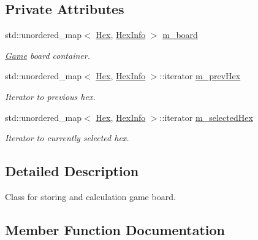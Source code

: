 \subsection*{Private Attributes}
\begin{DoxyCompactItemize}
\item 
std\+::unordered\+\_\+map$<$ \hyperlink{classHex}{Hex}, \hyperlink{structHexInfo}{Hex\+Info} $>$ \hyperlink{classBoard_a3f1155ac66a6cb3fe4d769860f0aba3b}{m\+\_\+board}\hypertarget{classBoard_a3f1155ac66a6cb3fe4d769860f0aba3b}{}\label{classBoard_a3f1155ac66a6cb3fe4d769860f0aba3b}

\begin{DoxyCompactList}\small\item\em \hyperlink{classGame}{Game} board container. \end{DoxyCompactList}\item 
std\+::unordered\+\_\+map$<$ \hyperlink{classHex}{Hex}, \hyperlink{structHexInfo}{Hex\+Info} $>$\+::iterator \hyperlink{classBoard_a4199477dd54758f6b278d566792645c5}{m\+\_\+prev\+Hex}\hypertarget{classBoard_a4199477dd54758f6b278d566792645c5}{}\label{classBoard_a4199477dd54758f6b278d566792645c5}

\begin{DoxyCompactList}\small\item\em Iterator to previous hex. \end{DoxyCompactList}\item 
std\+::unordered\+\_\+map$<$ \hyperlink{classHex}{Hex}, \hyperlink{structHexInfo}{Hex\+Info} $>$\+::iterator \hyperlink{classBoard_a0d1187868dd04c5eb7c2cbfeed42203d}{m\+\_\+selected\+Hex}\hypertarget{classBoard_a0d1187868dd04c5eb7c2cbfeed42203d}{}\label{classBoard_a0d1187868dd04c5eb7c2cbfeed42203d}

\begin{DoxyCompactList}\small\item\em Iterator to currently selected hex. \end{DoxyCompactList}\end{DoxyCompactItemize}


\subsection{Detailed Description}
Class for storing and calculation game board. 

\subsection{Member Function Documentation}
